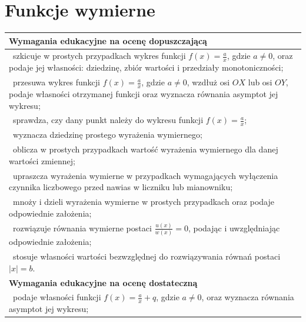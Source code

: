 \documentclass[12pt,a4paper]{article}
\begin{document}
	\section{Funkcje wymierne}
	
	\begin{longtable}{|p{16cm}|}
		\hline
		
		\textbf{Wymagania edukacyjne na ocenę dopuszczającą} \\ \hline
		
		\textbullet\ szkicuje w prostych przypadkach wykres funkcji $f(x)=\frac{a}{x}$, gdzie $a\neq 0$, oraz podaje jej własności: dziedzinę, zbiór wartości i przedziały monotoniczności; \\
		
		\textbullet\ przesuwa wykres funkcji $f(x)=\frac{a}{x}$, gdzie $a\neq 0$, wzdłuż osi $OX$ lub osi $OY$, podaje własności otrzymanej funkcji oraz wyznacza równania asymptot jej wykresu; \\
		
		\textbullet\ sprawdza, czy dany punkt należy do wykresu funkcji $f(x)=\frac{a}{x}$; \\
		
		\textbullet\ wyznacza dziedzinę prostego wyrażenia wymiernego; \\
		
		\textbullet\ oblicza w prostych przypadkach wartość wyrażenia wymiernego dla danej wartości zmiennej; \\
		
		\textbullet\ upraszcza wyrażenia wymierne w przypadkach wymagających wyłączenia czynnika liczbowego przed nawias w liczniku lub mianowniku; \\
		
		\textbullet\ mnoży i dzieli wyrażenia wymierne w prostych przypadkach oraz podaje odpowiednie założenia; \\
		
		\textbullet\ rozwiązuje równania wymierne postaci $\frac{u(x)}{w(x)}=0$, podając i uwzględniając odpowiednie założenia; \\
		
		\textbullet\ stosuje własności wartości bezwzględnej do rozwiązywania równań postaci $|x|=b$. \\ \hline
		
		\textbf{Wymagania edukacyjne na ocenę dostateczną} \\ \hline
		
		\textbullet\ podaje własności funkcji $f(x)=\frac{a}{x}+q$, gdzie $a\neq 0$, oraz wyznacza równania asymptot jej wykresu; \\
		

\end{longtable}
\end{document}
